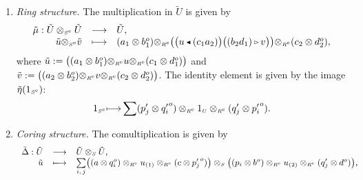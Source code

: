 \documentclass[reqno, a4paper, 10pt]{amsart}
\numberwithin{equation}{section}
\theoremstyle{plain}
\theoremstyle{definition}
\theoremstyle{remark}
\begin{document}
\begin{enumerate}
\item {\em Ring structure.}
The multiplication in $\tilde{U}$ is given by
\begin{equation}
\label{Eq:tilde_mu}
\begin{array}{rcl}
\tilde{\mu}: \tilde{U} \otimes_{{\scriptscriptstyle{{S^{\rm e}}}}} \tilde{U} &{ \longrightarrow  } & \tilde{U}, \\
{\tilde{{u}}} {\otimes_{\scriptscriptstyle{{\scriptscriptstyle{{S^{\rm e}}}}}}} {\tilde{{v}}}  &{ \longmapsto  } & (a_1 \otimes b_1^o) {\otimes_{\scriptscriptstyle{{\scriptscriptstyle{{R^{\rm e}}}}}}} {\big( {\big(u {{\,\raise1pt\hbox{$\scriptscriptstyle{\blacktriangleleft}$} \, }} (c_1a_2)\big)\big((b_2d_1) {{\,\raise1pt\hbox{$\scriptscriptstyle{\rhd}$} \, }} v \big) } \big)}
{\otimes_{\scriptscriptstyle{{\scriptscriptstyle{{R^{\rm e}}}}}}} (c_2 \otimes d_2^o),
\end{array}
\end{equation}
where ${\tilde{{u}}}:= {\big( {(a_1 \otimes b_1^o) {\otimes_{\scriptscriptstyle{{\scriptscriptstyle{{R^{\rm e}}}}}}} u {\otimes_{\scriptscriptstyle{{\scriptscriptstyle{{R^{\rm e}}}}}}} (c_1 \otimes d_1^o)} \big)}$ and ${\tilde{{v}}}:= {\big( {(a_2 \otimes b_2^o) {\otimes_{\scriptscriptstyle{{\scriptscriptstyle{{R^{\rm e}}}}}}} v {\otimes_{\scriptscriptstyle{{\scriptscriptstyle{{R^{\rm e}}}}}}} (c_2 \otimes d_2^o)} \big)}$.
The identity element is given by the image ${\tilde{{\eta}}}(1_{{\scriptscriptstyle{{S^{\rm e}}}}})$:
$$
1_{{\scriptscriptstyle{{S^{\rm e}}}}} { \longmapsto  } \sum (p'_j \otimes {q'_i}^o) \otimes_{{\scriptscriptstyle{{R^{\rm e}}}}} 1_{{\scriptscriptstyle{U}}} \otimes_{{\scriptscriptstyle{{R^{\rm e}}}}} (q'_j \otimes {p'_i}^o). 
$$
\item {\em Coring structure.}
The comultiplication is given by 
\begin{equation}
\label{Eq:tilde_Delta}
\begin{small}
\begin{array}{rcl}
\tilde{\Delta}: \tilde{U} &{ \longrightarrow  }&  \tilde{U} \otimes_{{\scriptscriptstyle{S}}} \tilde{U}, \\
 {\tilde{{u}}}  &{ \longmapsto  }& \underset{i,\, j}{\sum} {\big( {(a \otimes q_i^o) \otimes_{{\scriptscriptstyle{{R^{\rm e}}}}} u_{(1)} \otimes_{{\scriptscriptstyle{{R^{\rm e}}}}} (c \otimes {p'_j}^o)} \big)}  
\otimes_{{\scriptscriptstyle{S}}} {\big( {(p_i \otimes b^o) \otimes_{{\scriptscriptstyle{{R^{\rm e}}}}} u_{(2)} \otimes_{{\scriptscriptstyle{{R^{\rm e}}}}} (q'_j \otimes d^o)} \big)},
\end{array}

\end{small}
\end{equation}
\end{enumerate}
\end{document}
